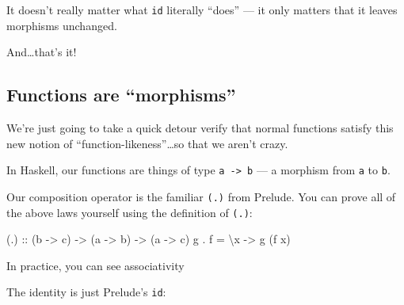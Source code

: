 \documentclass[]{article}
\newenvironment{Shaded}{}{}
\newcommand{\DataTypeTok}[1]{\textcolor[rgb]{0.56,0.13,0.00}{#1}}
\newcommand{\DecValTok}[1]{\textcolor[rgb]{0.25,0.63,0.44}{#1}}
\newcommand{\NormalTok}[1]{#1}
\newcommand{\OperatorTok}[1]{\textcolor[rgb]{0.40,0.40,0.40}{#1}}
\newcommand{\OtherTok}[1]{\textcolor[rgb]{0.00,0.44,0.13}{#1}}
\begin{document}
It doesn't really matter what \texttt{id} literally ``does'' --- it only matters
that it leaves morphisms unchanged.

And\ldots that's it!

\hypertarget{functions-are-morphisms}{%
\subsection{Functions are ``morphisms''}\label{functions-are-morphisms}}

We're just going to take a quick detour verify that normal functions satisfy
this new notion of ``function-likeness''\ldots so that we aren't crazy.

In Haskell, our functions are things of type \texttt{a\ -\textgreater{}\ b} ---
a morphism from \texttt{a} to \texttt{b}.

Our composition operator is the familiar \texttt{(.)} from Prelude. You can
prove all of the above laws yourself using the definition of \texttt{(.)}:

\begin{Shaded}
\begin{Highlighting}[]
\OtherTok{(.) ::}\NormalTok{ (b }\OtherTok{{-}>}\NormalTok{ c) }\OtherTok{{-}>}\NormalTok{ (a }\OtherTok{{-}>}\NormalTok{ b) }\OtherTok{{-}>}\NormalTok{ (a }\OtherTok{{-}>}\NormalTok{ c)}
\NormalTok{g }\OperatorTok{.}\NormalTok{ f }\OtherTok{=}\NormalTok{ \textbackslash{}x }\OtherTok{{-}>}\NormalTok{ g (f x)}
\end{Highlighting}
\end{Shaded}

In practice, you can see associativity

\begin{Shaded}
\end{Shaded}

The identity is just Prelude's \texttt{id}:
\end{document}
